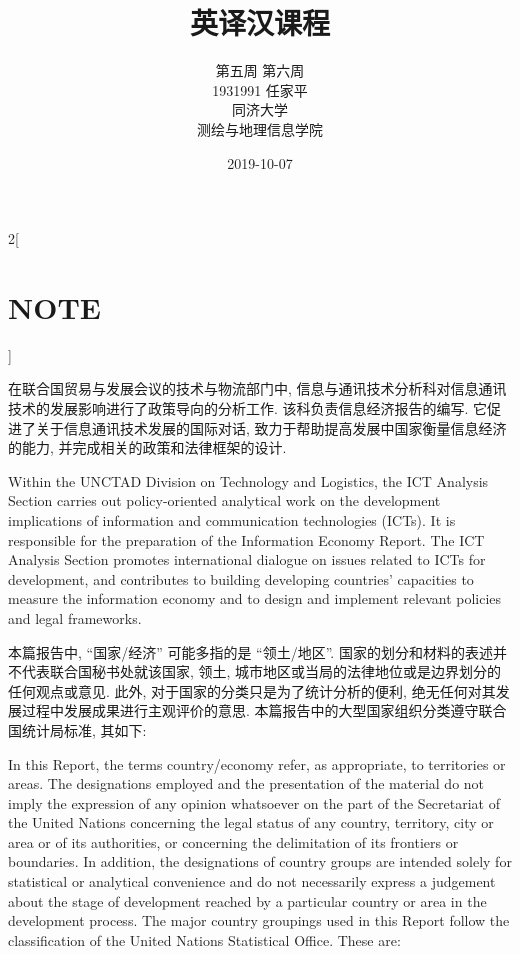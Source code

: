 \documentclass[a4paper, UTF8, 12pt]{article}
\begin{document}
\title{\Huge 英译汉课程}
\author{\Large 
        第五周 第六周 \\[12pt]
        1931991 任家平 \\[12pt]
        同济大学 \\[12pt]
        测绘与地理信息学院}
\date{2019-10-07}

\maketitle
\thispagestyle{empty}

\newpage
{}
\tableofcontents
{}

\newpage
{}

\begin{paracol}{2}[\section{NOTE}]
    
    \switchcolumn*
    在联合国贸易与发展会议的技术与物流部门中, 信息与通讯技术分析科对信息通讯技术的发展影响进行了政策导向的分析工作. 该科负责信息经济报告的编写. 它促进了关于信息通讯技术发展的国际对话, 致力于帮助提高发展中国家衡量信息经济的能力, 并完成相关的政策和法律框架的设计.

    \switchcolumn
    Within the UNCTAD Division on Technology and Logistics, the ICT Analysis Section carries out policy-oriented analytical work on the development implications of information and communication technologies (ICTs). It is responsible for the preparation of the Information Economy Report. The ICT Analysis Section promotes international dialogue on issues related to ICTs for development, and contributes to building developing countries’ capacities to measure the information economy and to design and implement relevant policies and legal frameworks. 

    \switchcolumn*
    本篇报告中, ``国家/经济'' 可能多指的是 ``领土/地区''. 国家的划分和材料的表述并不代表联合国秘书处就该国家, 领土, 城市地区或当局的法律地位或是边界划分的任何观点或意见. 此外, 对于国家的分类只是为了统计分析的便利, 绝无任何对其发展过程中发展成果进行主观评价的意思. 本篇报告中的大型国家组织分类遵守联合国统计局标准, 其如下:

    \switchcolumn
    In this Report, the terms country/economy refer, as appropriate, to territories or areas. The designations employed and the presentation of the material do not imply the expression of any opinion whatsoever on the part of the Secretariat of the United Nations concerning the legal status of any country, territory, city or area or of its authorities, or concerning the delimitation of its frontiers or boundaries. In addition, the designations of country groups are intended solely for statistical or analytical convenience and do not necessarily express a judgement about the stage of development reached by a particular country or area in the development process. The major country groupings used in this Report follow the classification of the United Nations Statistical Office. These are: 


\end{paracol}
\end{document}
